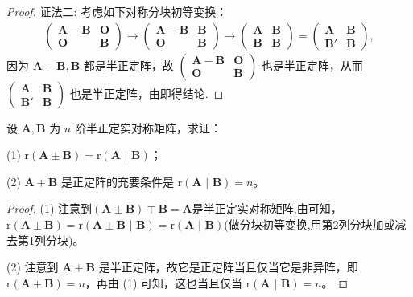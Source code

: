 \documentclass[../../main.tex]{subfiles}%
\begin{document}
\begin{proof}
{\color{blue}证法二:}
考虑如下对称分块初等变换：
\begin{align*}
\begin{pmatrix}
\boldsymbol{A}-\boldsymbol{B} & \boldsymbol{O} \\
\boldsymbol{O} & \boldsymbol{B}
\end{pmatrix}\to
\begin{pmatrix}
\boldsymbol{A}-\boldsymbol{B} & \boldsymbol{B} \\
\boldsymbol{O} & \boldsymbol{B}
\end{pmatrix}\to
\begin{pmatrix}
\boldsymbol{A} & \boldsymbol{B} \\
\boldsymbol{B} & \boldsymbol{B}
\end{pmatrix}=\begin{pmatrix}
\boldsymbol{A} & \boldsymbol{B} \\
\boldsymbol{B}' & \boldsymbol{B}
\end{pmatrix},
\end{align*}
因为 $\boldsymbol{A}-\boldsymbol{B},\boldsymbol{B}$ 都是半正定阵，故 $\begin{pmatrix}
\boldsymbol{A}-\boldsymbol{B} & \boldsymbol{O} \\
\boldsymbol{O} & \boldsymbol{B}
\end{pmatrix}$ 也是半正定阵，从而 $\begin{pmatrix}
\boldsymbol{A} & \boldsymbol{B} \\
\boldsymbol{B}' & \boldsymbol{B}
\end{pmatrix}$ 也是半正定阵，由即得结论.
\end{proof}

\begin{proposition}\label{proposition:例8.77}
设 $\boldsymbol{A},\boldsymbol{B}$ 为 $n$ 阶半正定实对称矩阵，求证：

(1) $\mathrm{r}(\boldsymbol{A}\pm \boldsymbol{B})=\mathrm{r}(\boldsymbol{A}\,\,|\,\,\boldsymbol{B})$；

(2) $\boldsymbol{A}+\boldsymbol{B}$ 是正定阵的充要条件是 $\mathrm{r}(\boldsymbol{A}\,\,|\,\,\boldsymbol{B})=n$。
\end{proposition}
\begin{proof}
(1) 注意到$(\boldsymbol{A}\pm \boldsymbol{B})\mp \boldsymbol{B}=\boldsymbol{A}$是半正定实对称矩阵,由可知，$\mathrm{r}(\boldsymbol{A}\pm \boldsymbol{B})=\mathrm{r}(\boldsymbol{A}\pm\boldsymbol{B}\,\,|\,\,\boldsymbol{B})=\mathrm{r}(\boldsymbol{A}\,\,|\,\,\boldsymbol{B})$(做分块初等变换,用第2列分块加或减去第1列分块)。

(2) 注意到 $\boldsymbol{A}+\boldsymbol{B}$ 是半正定阵，故它是正定阵当且仅当它是非异阵，即 $\mathrm{r}(\boldsymbol{A}+\boldsymbol{B})=n$，再由 (1) 可知，这也当且仅当 $\mathrm{r}(\boldsymbol{A}\,\,|\,\,\boldsymbol{B})=n$。
\end{proof}
\end{document}

